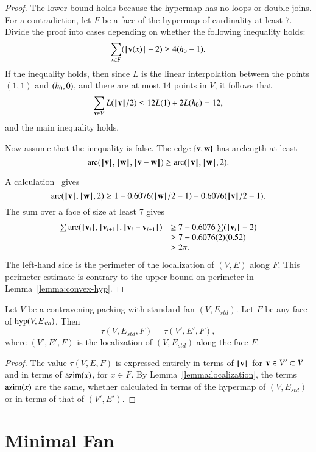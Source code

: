\begin{proof} The lower bound holds because the hypermap has no loops or double joins.  For a contradiction, let $F$ be a face of the hypermap of cardinality at least $7$.  Divide the proof into cases depending on whether the
following inequality holds:
$$
\sum _{x\in F} (\normo{\v(x)}-2) \ge 4(\hm-1).
$$
If the inequality holds, then since $L$ is the linear interpolation between the points $(1,1)$ and $(\hm,0)$, and there are at most $14$ points in $V$, it follows that
$$\sum_{\v\in V}L(\normo{\v}/2) \le 12 L(1) + 2 L(\hm) =12,$$
and the main inequality holds.

Now assume that the inequality is false.
The edge $\{\v,\w\}$ has arclength at least
$$
\arc(\normo{\v},\normo{\w},\norm{\v}{\w}) \ge \arc(\normo{\v},\normo{\w},2). 
$$

A calculation~\cite[cc:arc]{hales:2009:nonlinear} gives
$$\arc(\normo{\v},\normo{\w},2)\ge 1 - 0.6076 (\normo{\w}/2 - 1) - 0.6076 (\normo{\v}/2 - 1).$$ %
The sum over a face of size at least $7$ gives
$$
\begin{array}{lll}
\sum \arc(\normo{\v_i},\normo{\v_{i+1}},\norm{\v_i}{\v_{i+1}})&\ge
7 - 0.6076 \sum (\normo{\v_i}-2) \\
   &\ge 7 - 0.6076 (2) (0.52) \\
   &> 2\pi.
\end{array}
$$
The left-hand side is the perimeter of the localization of $(V,E)$ along $F$.
This perimeter estimate is contrary to the upper bound on perimeter in Lemma~\ref{lemma:convex-hyp}.
\end{proof}

\begin{lemma}  Let $V$ be a contravening packing with
standard fan $(V,E_{std})$.  Let $F$ be any face of $\op{hyp}(V,E_{std})$.  Then
$$
\tau(V,E_{std},F) = \tau(V',E',F),
$$
where $(V',E',F)$ is the localization of $(V,E_{std})$ along the face $F$.
\end{lemma}

\begin{proof}  The value $\tau(V,E,F)$ is expressed entirely in terms of $\normo{\v}$ for $\v\in V'\subset V$ and in terms of $\op{azim}(x)$, for $x\in F$.  By Lemma~\ref{lemma:localization}, the terms $\op{azim}(x)$ are the same, whether calculated in terms of the hypermap of $(V,E_{std})$ or in terms of that of $(V',E')$. 
\end{proof}


\section{Minimal Fan}\label{sec:weight}  


